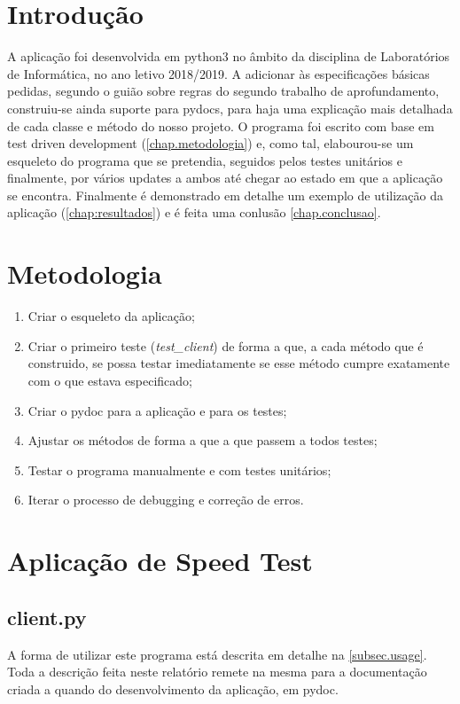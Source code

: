 \documentclass{report}
\begin{document}
\chapter{Introdução}
\label{chap.introducao}

A aplicação foi desenvolvida em python3 no âmbito da disciplina de Laboratórios de Informática, no ano letivo 2018/2019. A adicionar às especificações básicas pedidas, segundo o guião sobre regras do segundo trabalho de aprofundamento, construiu-se ainda suporte para pydocs, para haja uma explicação mais detalhada de cada classe e método do nosso projeto. O programa foi escrito com base em test driven development  (\autoref{chap.metodologia}) e, como tal, elabourou-se um esqueleto do programa que se pretendia, seguidos pelos testes unitários e finalmente, por vários updates a ambos até chegar ao estado em que a aplicação se encontra. Finalmente é demonstrado em detalhe um exemplo de utilização da aplicação (\autoref{chap:resultados}) e é feita uma conlusão \autoref{chap.conclusao}.


\chapter{Metodologia}
\label{chap.metodologia}

\begin{enumerate}
	\item Criar o esqueleto da aplicação;
	\item Criar o primeiro teste (\textit{test\_client}) de forma a que, a cada método que é construido, se possa testar imediatamente se esse método cumpre exatamente com o que estava especificado;
	\item Criar o pydoc para a aplicação e para os testes;
	\item Ajustar os métodos de forma a que a que passem a todos testes;
	\item Testar o programa manualmente e com testes unitários;
	\item Iterar o processo de debugging e correção de erros.
\end{enumerate}


\chapter{Aplicação de Speed Test}
\label{chap.Aplicação de Speed Test}
\section{client.py}
\label{sec.client}
A forma de utilizar este programa está descrita em detalhe na \autoref{subsec.usage}. Toda a descrição feita neste relatório remete na mesma para a documentação criada a quando do desenvolvimento da aplicação, em pydoc.
\end{document}
